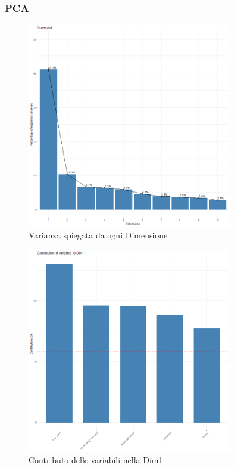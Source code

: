 \begin{frame}[fragile]
\frametitle{PCA}
\begin{minipage}{0.45\textwidth}
\begin{figure}[H]
    \centering
    \includegraphics[width=0.8\textwidth]{Img/PCA001.png}
    \caption{Varianza spiegata da ogni Dimensione}
\end{figure}
\end{minipage}%
\hspace{3em}
\begin{minipage}{0.45\textwidth}
\begin{figure}[H]
    \centering
    \includegraphics[width=0.8\textwidth]{Img/PCA002.png}
    \caption{Contributo delle variabili nella Dim1}
\end{figure}
\end{minipage}%
\end{frame}

